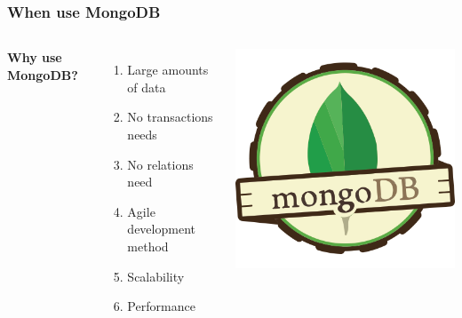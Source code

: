 \documentclass{beamer}
\begin{document}
\begin{frame}
\frametitle{When use MongoDB}
\begin{columns}[c] %

\textbf{Why use MongoDB?}
\begin{enumerate}
\item Large amounts of data
\item No transactions needs
\item No relations need
\item Agile development method
\item Scalability
\item Performance
\end{enumerate}

\includegraphics[width=1.2\linewidth]{mongodb.png}

\end{columns}
\end{frame}


\end{document}
